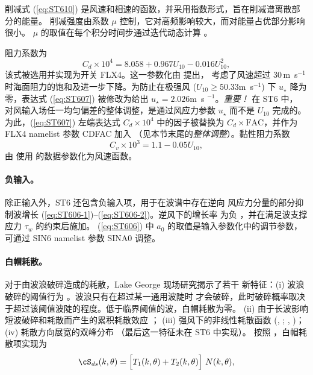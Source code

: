 \noindent
削减式 (\ref{eq:ST610}) 是风速和相速的函数，并采用指数形式，旨在削减谱离散部分的能量。
削减强度由系数 $\mu$ 控制，它对高频影响较大，而对能量占优部分影响很小。
$\mu$ 的取值在每个积分时间步通过迭代动态计算 \citep{art:Tea10}。

阻力系数为
\begin{equation}\label{eq:ST607}
C_d \times 10^4 = 8.058 + 0.967 U_{10} - 0.016 U_{10}^2 ,
\end{equation}
该式被选用并实现为开关 {\code FLX4}。这一参数化由 \citet{art:Hwa11} 提出，
考虑了风速超过 30\,m~s$^{-1}$ 时海面阻力的饱和及进一步下降。为防止在极强风
($U_{10}\ge50.33$m~s$^{-1}$) 下 $u_\star$ 降为零，表达式 (\ref{eq:ST607})
被修改为给出 $u_\star=2.026$m~s $^{-1}$。{\it 重要！} 在 {\code ST6} 中，
对风输入场任一均匀偏差的整体调整，是通过风应力参数 $u_\star$ 而不是 $U_{10}$ 完成的。
为此，(\ref{eq:ST607}) 左端表达式 $C_d \times 10^4$ 中的因子被替换为
$C_d \times \mathrm{FAC}$，并作为 {\F FLX4} namelist 参数 {\code CDFAC} 加入
（见本节末尾的{\it 整体调整}）。黏性阻力系数
\begin{equation}\label{eq:ST608}
  C_v \times 10^3 = 1.1 - 0.05 U_{10} ,
\end{equation}
由 \citet{art:Tea10} 使用 \citet{art:BP98} 的数据参数化为风速函数。

\paragraph{负输入。} 除正输入外，{\code ST6} 还包含负输入项，用于在波谱中存在逆向
风应力分量的部分抑制波增长 (\ref{eq:ST606-1})--(\ref{eq:ST606-2})。逆风下的增长率
为负 \citep{pro:Don99}，并在满足波支撑应力 $\tau_w$ 的约束后施加。
(\ref{eq:ST606}) 中 $a_0$ 的取值是输入参数化中的调节参数，可通过 {\F SIN6}
namelist 参数 {\code  SINA0} 调整。

\noindent
\paragraph{白帽耗散。} 对于由波浪破碎造成的耗散，Lake George 现场研究揭示了若干
新特征：(i) 波浪破碎的阈值行为 \citep{art:BBY01}。波浪只有在超过某一通用波陡时
才会破碎，此时破碎概率取决于超过该阈值波陡的程度。低于临界阈值的波，白帽耗散为零。
(ii) 由于长波影响短波破碎和耗散而产生的累积耗散效应
\citep{pro:Don01,pro:BY05,art:Mea06,art:YB06,art:Bea10}；
(iii) 强风下的非线性耗散函数
(\citeauthor{art:Mea06}, \citeyear{art:Mea06};\linebreak
 \citeauthor{art:Bea07}, \citeyear{art:Bea07})；
(iv) 耗散方向展宽的双峰分布
\citep{art:YB06,art:Bea10}（最后这一特征未在 {\code ST6} 中实现）。
按照 \citet{art:RBW12}，白帽耗散项实现为
\begin{equation}\label{eq:ST620}
  \cS_{ds}(k,\theta) = \Bigl [ T_1(k,\theta) + T_2(k,\theta) \Bigr ]\ N(k,\theta) ,
\end{equation}

